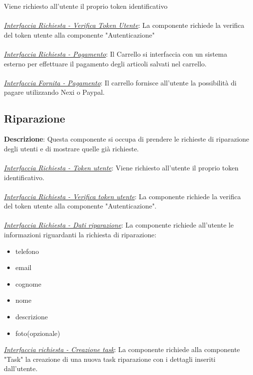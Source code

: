 \documentclass{report}
\begin{document}
Viene richiesto all'utente il proprio token identificativo\\ \\
\uline{\textit{Interfaccia Richiesta - Verifica Token Utente}}: 
La componente richiede la verifica del token utente alla componente "Autenticazione"\\\\
\uline{\textit{Interfaccia Richiesta - Pagamento}}:
Il Carrello si interfaccia con un sistema esterno per effettuare il pagamento degli articoli salvati nel carrello.\\\\
\uline{\textit{Interfaccia Fornita - Pagamento}}:
Il carrello fornisce all'utente la possibilità di pagare utilizzando Nexi o Paypal.

\subsection*{Riparazione}
\textbf{Descrizione}: Questa componente si occupa di prendere le richieste di riparazione degli utenti e di mostrare quelle già richieste.\\\\
\uline{\textit{Interfaccia Richiesta - Token utente}}: 
Viene richiesto all'utente il proprio token identificativo.\\\\
\uline{\textit{Interfaccia Richiesta - Verifica token utente}}:
La componente richiede la verifica del token utente alla componente "Autenticazione".\\\\
\uline{\textit{Interfaccia Richiesta - Dati riparazione}}:
La componente richiede all'utente le informazioni riguardanti la richiesta di riparazione:
\begin{itemize}
	\item telefono
	\item email
	\item cognome
	\item nome
	\item descrizione
	\item foto(opzionale)
\end{itemize}
\uline{\textit{Interfaccia richiesta - Creazione task}}: 
La componente richiede alla componente "Task" la creazione di una nuova task riparazione con i dettagli inseriti dall'utente.\\\\
\end{document}
